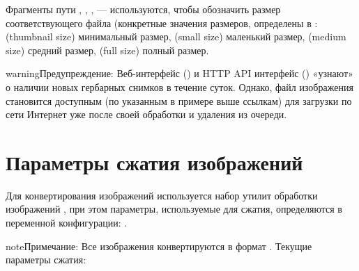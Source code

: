 \documentclass[letterpaper,10pt,russian]{sphinxmanual}
\begin{document}
Фрагменты пути , , ,  — используются, чтобы обозначить
размер соответствующего файла (конкретные
значения размеров, определены в :  (thumbnail size) \textendash{} минимальный размер,
 (small size) \textendash{} маленький размер,  (medium size) \textendash{} средний размер,
 (full size) \textendash{} полный размер.

\begin{sphinxadmonition}{warning}{Предупреждение:}
Веб-интерфейс () и HTTP API интерфейс ()
«узнают» о наличии новых гербарных снимков в течение суток. Однако, файл изображения становится
доступным (по указанным в примере выше ссылкам)
для загрузки по сети Интернет уже после своей обработки и удаления из очереди.
\end{sphinxadmonition}


\section{Параметры сжатия изображений}
\label{\detokenize{scanning:id7}}\label{\detokenize{scanning:source-image-url}}
Для конвертирования изображений используется набор утилит обработки изображений ,
при этом параметры, используемые для сжатия, определяются в переменной конфигурации:
.

\begin{sphinxadmonition}{note}{Примечание:}
Все изображения конвертируются в формат . Текущие параметры сжатия:

\begin{sphinxVerbatim}[commandchars=\\\{\}]
  
 
 
\end{sphinxVerbatim}
\end{sphinxadmonition}
\end{document}
